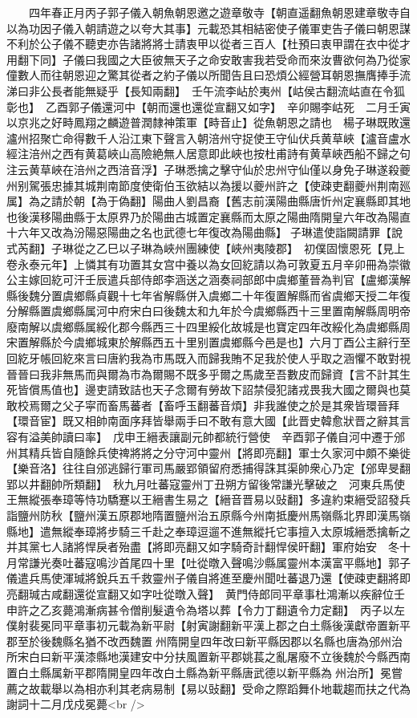 　　四年春正月丙子郭子儀入朝魚朝恩邀之遊章敬寺【朝直遥翻魚朝恩建章敬寺自以為功因子儀入朝請遊之以夸大其事】元載恐其相結密使子儀軍吏告子儀曰朝恩謀不利於公子儀不聽吏亦告諸將將士請衷甲以從者三百人【杜預曰衷甲謂在衣中從才用翻下同】子儀曰我國之大臣彼無天子之命安敢害我若受命而來汝曹欲何為乃從家僮數人而往朝恩迎之驚其從者之約子儀以所聞告且曰恐煩公經營耳朝恩撫膺捧手流涕曰非公長者能無疑乎【長知兩翻】　壬午流李岾於夷州【岵侯古翻流岵直在令狐彰也】　乙酉郭子儀還河中【朝而還也還從宣翻又如字】　辛卯賜李岵死　二月壬寅以京兆之好畤鳳翔之麟遊普潤隸神策軍【畤音止】從魚朝恩之請也　楊子琳既敗還瀘州招聚亡命得數千人沿江東下聲言入朝涪州守捉使王守仙伏兵黄草峽【瀘音盧水經注涪州之西有黄葛峽山高險絶無人居意即此峽也按杜甫詩有黄草峽西船不歸之句注云黄草峽在涪州之西涪音浮】子琳悉擒之擊守仙於忠州守仙僅以身免子琳遂殺夔州别駕張忠據其城荆南節度使衛伯玉欲結以為援以夔州許之【使疎吏翻夔州荆南廵属】為之請於朝【為于偽翻】陽曲人劉昌裔【舊志前漢陽曲縣唐忻州定襄縣即其地也後漢移陽曲縣于太原界乃於陽曲古城置定襄縣而太原之陽曲隋開皇六年改為陽直十六年又改為汾陽惡陽曲之名也武德七年復改為陽曲縣】子琳遣使詣闕請罪【說式芮翻】子琳從之乙巳以子琳為峽州團練使【峽州夷陵郡】　初僕固懷恩死【見上卷永泰元年】上憐其有功置其女宫中養以為女回紇請以為可敦夏五月辛卯冊為崇徽公主嫁回紇可汗壬辰遣兵部侍郎李涵送之涵奏祠部郎中虞鄉董晉為判官【盧鄉漢解縣後魏分置虞鄉縣貞觀十七年省解縣併入虞鄉二十年復置解縣而省虞鄉天授二年復分解縣置虞鄉縣属河中府宋白曰後魏太和九年於今虞鄉縣西十三里置南解縣周明帝廢南解以虞鄉縣属綏化郡今縣西三十四里綏化故城是也寶定四年改綏化為虞鄉縣周宋置解縣於今虞鄉城東於解縣西五十里别置虞鄉縣今邑是也】六月丁酉公主辭行至回紇牙帳回紇來言曰唐約我為市馬既入而歸我賄不足我於使人乎取之涵懼不敢對視晉晉曰我非無馬而與爾為市為爾賜不既多乎爾之馬歲至吾數皮而歸資【言不計其生死皆償馬值也】邊吏請致詰也天子念爾有勞故下詔禁侵犯諸戎畏我大國之爾與也莫敢校焉爾之父子寜而畜馬蕃者【畜呼玉翻蕃音煩】非我誰使之於是其衆皆環晉拜【環音宦】既又相帥南面序拜皆舉兩手曰不敢有意大國【此晋史韓愈狀晋之辭其言容有溢美帥讀曰率】　戊申王縉表讓副元帥都統行營使　辛酉郭子儀自河中遷于邠州其精兵皆自隨餘兵使禆將將之分守河中靈州【將即亮翻】軍士久家河中頗不樂徙【樂音洛】往往自邠逃歸行軍司馬嚴郢領留府悉捕得誅其渠帥衆心乃定【邠卑旻翻郢以井翻帥所類翻】　秋九月吐蕃寇靈州丁丑朔方留後常謙光擊破之　河東兵馬使王無縱張奉璋等恃功驕蹇以王縉書生易之【縉音晋易以䜴翻】多違約束縉受詔發兵詣鹽州防秋【鹽州漢五原郡地隋置鹽州治五原縣今州南抵慶州馬嶺縣北界即漢馬嶺縣地】遣無縱奉璋將步騎三千赴之奉璋逗遛不進無縱托它事擅入太原城縉悉擒斬之并其黨七人諸將悍戾者殆盡【將即亮翻又如字騎奇計翻悍侯旰翻】軍府始安　冬十月常謙光奏吐蕃寇鳴沙首尾四十里【吐從暾入聲鳴沙縣属靈州本漢富平縣地】郭子儀遣兵馬使渾瑊將銳兵五千救靈州子儀自將進至慶州聞吐蕃退乃還【使疎吏翻將即亮翻瑊古咸翻還從宣翻又如字吐從暾入聲】　黄門侍郎同平章事杜鴻漸以疾辭位壬申許之乙亥薨鴻漸病甚令僧削髮遺令為塔以葬【令力丁翻遺令力定翻】　丙子以左僕射裴冕同平章事初元載為新平尉【射寅謝翻新平漢上郡之白土縣後漢獻帝置新平郡至於後魏縣名猶不改西魏置州隋開皇四年改曰新平縣因郡以名縣也唐為邠州治所宋白曰新平漢漆縣地漢建安中分扶風置新平郡姚萇之亂屠廢不立後魏於今縣西南置白土縣属新平郡隋開皇四年改白土縣為新平縣唐武德以新平縣為州治所】冕嘗薦之故載舉以為相亦利其老病易制【易以䜴翻】受命之際蹈舞仆地載趨而扶之代為謝詞十二月戊戍冕薨<br />

